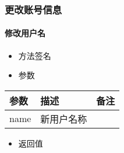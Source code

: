 \documentclass[letterpaper,10pt,english]{sphinxmanual}
\begin{document}
%
\begin{sphinxVerbatim}[commandchars=\\\{\}]
   
   
\end{sphinxVerbatim}


\subsubsection{更改账号信息}
\label{\detokenize{csharp:id19}}

\paragraph{修改用户名}
\label{\detokenize{csharp:id20}}\begin{itemize}
\item {} 
方法签名

\end{itemize}

%
\begin{sphinxVerbatim}[commandchars=\\\{\}]
   
\end{sphinxVerbatim}
\begin{itemize}
\item {} 
参数

\end{itemize}


\begin{savenotes}\sphinxattablestart
\centering
\begin{tabulary}{\linewidth}[t]{|T|T|T|}
\hline
\sphinxstyletheadfamily 
参数
&\sphinxstyletheadfamily 
描述
&\sphinxstyletheadfamily 
备注
\\
\hline
name
&
新用户名称
&\\
\hline
\end{tabulary}
\par
\sphinxattableend\end{savenotes}
\begin{itemize}
\item {} 
返回值

\end{itemize}
\end{document}
